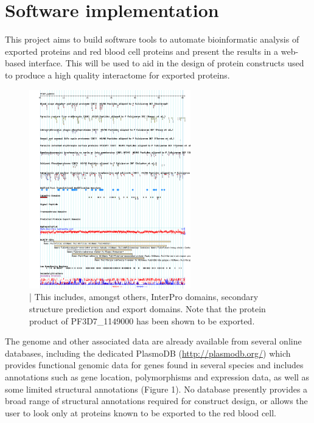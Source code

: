 \documentclass[fleqn,10pt]{article} %
\begin{document}
\section{Software implementation}

This project aims to build software tools to automate bioinformatic analysis of \pf exported proteins and red blood cell proteins and present the results in a web-based interface. This will be used to aid in the design of protein constructs used to produce a high quality interactome for exported \pf proteins. 


\begin{figure}
\includegraphics[width=7cm]{figs/plasmodbview}
\caption{ | This includes, amongst others, InterPro domains, secondary structure prediction and export domains. Note that the protein product of PF3D7\_1149000 has been shown to be exported.}
\label{fig:plasmodb}
\end{figure}

The \pf genome and other associated data are already available from several online databases, including the dedicated PlasmoDB (\url{http://plasmodb.org/}) \cite{Aurrecoechea2009} which provides functional genomic data for genes found in several  species and includes annotations such as gene location, polymorphisms and expression data, as well as some limited structural annotations (Figure 1). No database presently provides a broad range of structural annotations required for construct design, or allows the user to look only at proteins known to be exported to the red blood cell.

\end{document}
